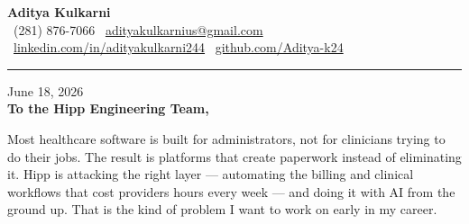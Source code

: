 \documentclass[11pt,letterpaper]{article}
\begin{document}
\begin{center}
    {\Huge \textbf{\color{HippTeal} Aditya Kulkarni}}\\[8pt]
    {\color{DarkGrey} \small
    \faPhone \ (281) 876-7066 \quad \textbar \quad
    \faEnvelope \ \href{mailto:adityakulkarnius@gmail.com}{adityakulkarnius@gmail.com} \\[4pt]
    \faLinkedin \ \href{https://linkedin.com/in/adityakulkarni244}{linkedin.com/in/adityakulkarni244} \quad \textbar \quad
    \faGithub \ \href{https://github.com/Aditya-k24}{github.com/Aditya-k24}
    }
\end{center}

\vspace{-4pt}
{\color{HippTeal}\rule{\linewidth}{1.5pt}}
\vspace{10pt}

June 18, 2026\\[10pt]
\textbf{To the Hipp Engineering Team,}

\vspace{6pt}

Most healthcare software is built for administrators, not for clinicians trying to do their jobs. The result is platforms that create paperwork instead of eliminating it. Hipp is attacking the right layer --- automating the billing and clinical workflows that cost providers hours every week --- and doing it with AI from the ground up. That is the kind of problem I want to work on early in my career.

\vspace{4pt}
\end{document}

